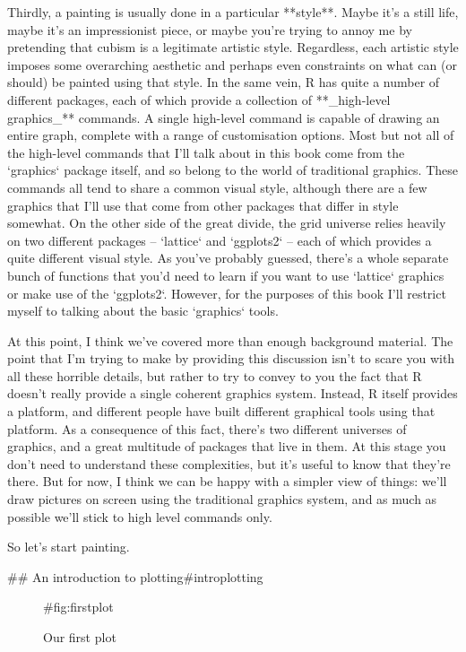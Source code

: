Thirdly, a painting is usually done in a particular **style**. Maybe it's a still life, maybe it's an impressionist piece, or maybe you're trying to annoy me by pretending that cubism is a legitimate artistic style. Regardless, each artistic style imposes some overarching aesthetic and perhaps even constraints on what can (or should) be painted using that style. In the same vein, R has quite a number of different packages, each of which provide a collection of **_high-level graphics_** commands. A single high-level command is capable of drawing an entire graph, complete with a range of customisation options. Most but not all of the high-level commands that I'll talk about in this book come from the `graphics` package itself, and so belong to the world of traditional graphics. These commands all tend to share a common visual style, although there are a few graphics that I'll use that come from other packages that differ in style somewhat. On the other side of the great divide, the grid universe relies heavily on two different packages -- `lattice` and `ggplots2` -- each of which provides a quite different visual style. As you've probably guessed, there's a whole separate bunch of functions that you'd need to learn if you want to use `lattice` graphics or make use of the `ggplots2`. However, for the purposes of this book I'll restrict myself to talking about the basic `graphics` tools. 


At this point, I think we've covered more than enough background material. The point that I'm trying to make by providing this discussion isn't to scare you with all these horrible details, but rather to try to convey to you the fact that R doesn't really provide a single coherent graphics system. Instead, R itself provides a platform, and different people have built different graphical tools using that platform. As a consequence of this fact, there's two different universes of graphics, and a great multitude of packages that live in them. At this stage you don't need to understand these complexities, but it's useful to know that they're there. But for now, I think we can be happy with a simpler view of things: we'll draw pictures on screen using the traditional graphics system, and as much as possible we'll stick to high level commands only.

So let's start painting.

## An introduction to plotting{#introplotting}

\begin{figure}[t]
\begin{center}
\caption{Our first plot}
\HR
{#fig:firstplot}
\end{center}
\end{figure}


